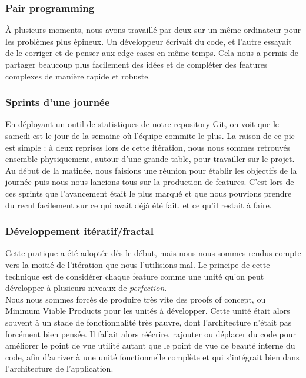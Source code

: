 	\subsubsection{Pair programming}
	\`A plusieurs moments, nous avons travaillé par deux sur un même ordinateur pour
	les problèmes plus épineux. Un développeur écrivait du code, et l'autre essayait
	de le corriger et de penser aux edge cases en même temps. Cela nous a permis de 
	partager beaucoup plus facilement des idées et de compléter des features
	complexes de manière rapide et robuste.

	\subsubsection{Sprints d'une journée}
	En déployant un outil de statistiques de notre repository Git, on voit que le 
	samedi est le jour de la semaine où l'équipe commite le plus. La raison de ce 
	pic est simple : à deux reprises lors de cette itération, nous nous sommes
	retrouvés ensemble physiquement, autour d'une grande table, pour travailler sur
	le projet. \\

	Au début de la matinée, nous faisions une réunion pour établir les
	objectifs de la journée puis nous nous lancions tous sur la production de
	features. C'est lors de ces sprints que l'avancement était le plus marqué et 
	que nous pouvions prendre du recul facilement sur ce qui avait déjà été fait, 
	et ce qu'il restait à faire.

	\subsubsection{Développement itératif/fractal}
	Cette pratique a été adoptée dès le début, mais nous nous sommes rendus compte
	vers la moitié de l'itération que nous l'utilisions mal. Le principe de cette
	technique est de considérer chaque feature comme une unité qu'on peut développer
	à plusieurs niveaux de \textit{perfection}. \\

	Nous nous sommes forcés de produire très vite des proofs of concept, ou 
	Minimum Viable Products pour les unités à développer. Cette unité était 
	alors souvent à un stade de fonctionnalité très pauvre, dont l'architecture 
	n'était pas forcément bien pensée. Il fallait alors réécrire, rajouter ou 
	déplacer du code pour améliorer le point de vue utilité autant que le point 
	de vue de beauté interne du code, afin d'arriver à une unité fonctionnelle 
	complète et qui s'intégrait bien dans l'architecture de l'application. \\

